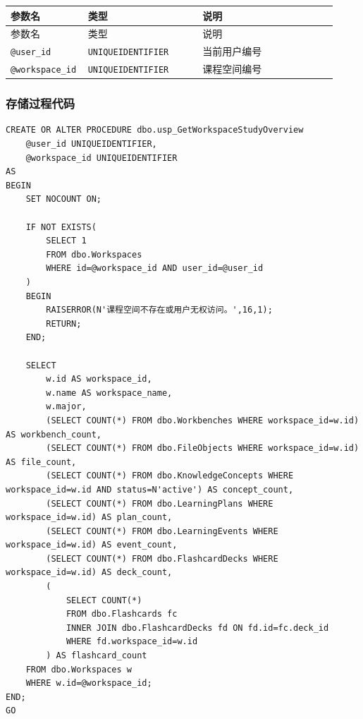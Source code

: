 \documentclass[10pt,a4paper,fontset=none]{ctexart}
\begin{document}
\begingroup\scriptsize
\renewcommand{\arraystretch}{1.18}
\setlength{\LTleft}{0pt}
\setlength{\LTright}{0pt}
\begin{longtable}{>{\raggedright\arraybackslash}p{0.18\linewidth}>{\raggedright\arraybackslash}p{0.34\linewidth}>{\raggedright\arraybackslash}p{0.40\linewidth}}
\toprule
参数名 & 类型 & 说明 \\
\midrule
\endfirsthead
\toprule
参数名 & 类型 & 说明 \\
\midrule
\endhead
\texttt{@user\_id} & \texttt{UNIQUEIDENTIFIER} & 当前用户编号 \\
\texttt{@workspace\_id} & \texttt{UNIQUEIDENTIFIER} & 课程空间编号 \\
\bottomrule
\end{longtable}
\endgroup


\subsubsection*{存储过程代码}

\begin{Verbatim}[fontsize=\scriptsize,frame=single]
CREATE OR ALTER PROCEDURE dbo.usp_GetWorkspaceStudyOverview
    @user_id UNIQUEIDENTIFIER,
    @workspace_id UNIQUEIDENTIFIER
AS
BEGIN
    SET NOCOUNT ON;

    IF NOT EXISTS(
        SELECT 1
        FROM dbo.Workspaces
        WHERE id=@workspace_id AND user_id=@user_id
    )
    BEGIN
        RAISERROR(N'课程空间不存在或用户无权访问。',16,1);
        RETURN;
    END;

    SELECT
        w.id AS workspace_id,
        w.name AS workspace_name,
        w.major,
        (SELECT COUNT(*) FROM dbo.Workbenches WHERE workspace_id=w.id) AS workbench_count,
        (SELECT COUNT(*) FROM dbo.FileObjects WHERE workspace_id=w.id) AS file_count,
        (SELECT COUNT(*) FROM dbo.KnowledgeConcepts WHERE workspace_id=w.id AND status=N'active') AS concept_count,
        (SELECT COUNT(*) FROM dbo.LearningPlans WHERE workspace_id=w.id) AS plan_count,
        (SELECT COUNT(*) FROM dbo.LearningEvents WHERE workspace_id=w.id) AS event_count,
        (SELECT COUNT(*) FROM dbo.FlashcardDecks WHERE workspace_id=w.id) AS deck_count,
        (
            SELECT COUNT(*)
            FROM dbo.Flashcards fc
            INNER JOIN dbo.FlashcardDecks fd ON fd.id=fc.deck_id
            WHERE fd.workspace_id=w.id
        ) AS flashcard_count
    FROM dbo.Workspaces w
    WHERE w.id=@workspace_id;
END;
GO
\end{Verbatim}
\end{document}
